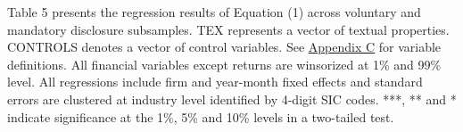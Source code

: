 \begin{table}
\begin{footnotesize}
			\noindent Table 5 presents the regression results of Equation (1) across voluntary and mandatory disclosure subsamples. TEX represents a vector of textual properties. CONTROLS denotes a vector of control variables. See \hyperref[appc]{Appendix C} for variable definitions. All financial variables except returns are winsorized at 1\% and 99\% level. All regressions include firm and year-month fixed effects and standard errors are clustered at industry level identified by 4-digit SIC codes. ***, ** and * indicate significance at the 1\%, 5\% and 10\% levels in a two-tailed test.
		\end{footnotesize}
\end{table}%